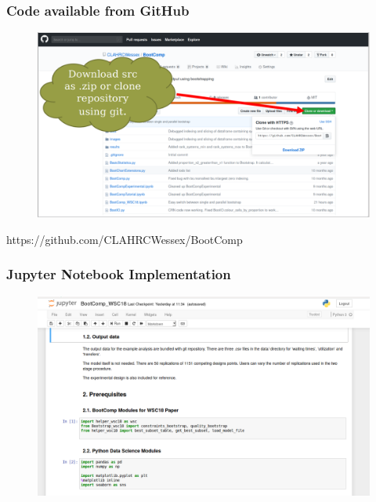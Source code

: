 \documentclass[aspectratio=169]{beamer}
\begin{document}

\begin{frame}
\frametitle{Code available from GitHub}
\begin{figure}
\includegraphics[width=0.95\linewidth]{github2.png}
\end{figure}
https://github.com/CLAHRCWessex/BootComp
\end{frame}



\begin{frame}
\frametitle{Jupyter Notebook Implementation}
\begin{figure}
\includegraphics[width=1.0\linewidth]{juypter1.png}
\end{figure}
\end{frame}

\end{document}
